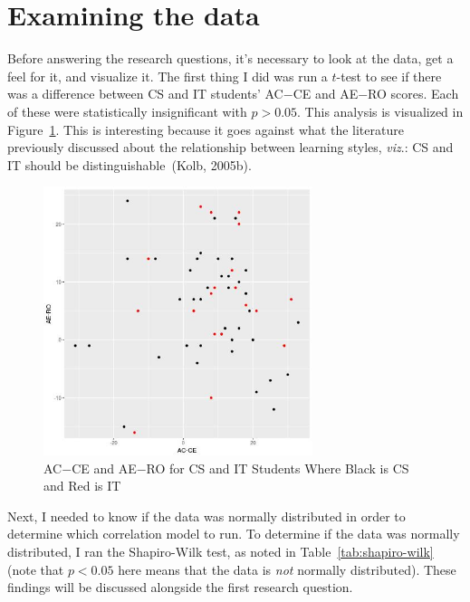 \section{Examining the data}
Before answering the research questions, it's necessary to look at the data, get a feel for it, and visualize it. The first thing I did was run a $t$-test to see if there was a difference between CS and IT students' AC$-$CE and AE$-$RO scores. Each of these were statistically insignificant with $p>0.05$. This analysis is visualized in Figure~\ref{fig:cs-v-it-plot}. This is interesting because it goes against what the literature previously discussed about the relationship between learning styles, \textit{viz}.: CS and IT should be distinguishable~(Kolb, 2005b).


\begin{figure}[!bhtb]
  \centering
  \includegraphics[width=0.7\textwidth]{figures/chapter4/cs-v-it-plot.jpg}
  \caption[AC$-$CE and AE$-$RO for CS and IT Students]{AC$-$CE and AE$-$RO for CS and IT Students Where Black is CS and Red is IT}
  \label{fig:cs-v-it-plot}
\end{figure}

Next, I needed to know if the data was normally distributed in order to determine which correlation model to run. To determine if the data was normally distributed, I ran the Shapiro-Wilk test, as noted in Table~\ref{tab:shapiro-wilk} (note that $p<0.05$ here means that the data is \emph{not} normally distributed). These findings will be discussed alongside the first research question.

